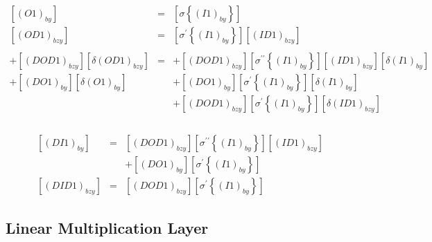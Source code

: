 \begin{eqnarray*}
\left[\left(O1\right)_{by}\right] & = & \left[\sigma\left\{ \left(I1\right)_{by}\right\} \right]\\
\left[\left(OD1\right)_{bzy}\right] & = & \left[\sigma^{\prime}\left\{ \left(I1\right)_{by}\right\} \right]\left[\left(ID1\right)_{bzy}\right]\\
\\
+\left[\left(DOD1\right)_{bzy}\right]\left[\delta\left(OD1\right)_{bzy}\right] & = & +\left[\left(DOD1\right)_{bzy}\right]\left[\sigma^{\prime\prime}\left\{ \left(I1\right)_{by}\right\} \right]\left[\left(ID1\right)_{bzy}\right]\left[\delta\left(I1\right)_{by}\right]\\
+\left[\left(DO1\right)_{by}\right]\left[\delta\left(O1\right)_{by}\right] &  & +\left[\left(DO1\right)_{by}\right]\left[\sigma^{\prime}\left\{ \left(I1\right)_{by}\right\} \right]\left[\delta\left(I1\right)_{by}\right]\\
 &  & +\left[\left(DOD1\right)_{bzy}\right]\left[\sigma^{\prime}\left\{ \left(I1\right)_{by}\right\} \right]\left[\delta\left(ID1\right)_{bzy}\right]\\
\\
\end{eqnarray*}

\begin{eqnarray*}
\left[\left(DI1\right)_{by}\right] & = & \left[\left(DOD1\right)_{bzy}\right]\left[\sigma^{\prime\prime}\left\{ \left(I1\right)_{by}\right\} \right]\left[\left(ID1\right)_{bzy}\right]\\
 &  & +\left[\left(DO1\right)_{by}\right]\left[\sigma^{\prime}\left\{ \left(I1\right)_{by}\right\} \right]\\
\left[\left(DID1\right)_{bzy}\right] & = & \left[\left(DOD1\right)_{bzy}\right]\left[\sigma^{\prime}\left\{ \left(I1\right)_{by}\right\} \right]
\end{eqnarray*}

\subsection{Linear Multiplication Layer}

